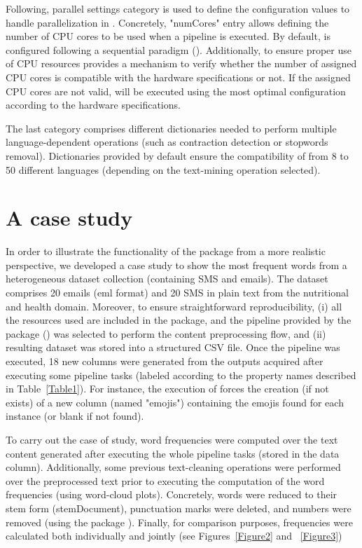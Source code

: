 Following, parallel settings category is used to define the configuration values to handle parallelization in . Concretely, "numCores" entry allows defining the number of CPU cores to be used when a pipeline is executed. By default,  is configured following a sequential paradigm (). Additionally, to ensure proper use of CPU resources  provides a mechanism to verify whether the number of assigned CPU cores is compatible with the hardware specifications or not. If the assigned CPU cores are not valid,  will be executed using the most optimal configuration according to the hardware specifications.

The last category comprises different dictionaries needed to perform multiple language-dependent operations (such as contraction detection or stopwords removal). Dictionaries provided by default ensure the compatibility of  from 8 to 50 different languages (depending on the text-mining operation selected).

\section{A case study}

In order to illustrate the functionality of the  package from a more realistic perspective, we developed a case study to show the most frequent words from a heterogeneous dataset collection (containing SMS and emails). The dataset comprises 20 emails (eml format) and 20 SMS in plain text from the nutritional and health domain. Moreover, to ensure straightforward reproducibility, (i) all the resources used are included in the package, and the pipeline provided by the package () was selected to perform the content preprocessing flow, and (ii) resulting dataset was stored into a structured CSV file. Once the pipeline was executed, 18 new columns were generated from the outputs acquired after executing some pipeline tasks (labeled according to the property names described in Table~\ref{Table1}). For instance, the execution of  forces the creation (if not exists) of a new column (named "emojis") containing the emojis found for each instance (or blank if not found). 

To carry out the case of study, word frequencies were computed over the text content generated after executing the whole pipeline tasks (stored in the data column). Additionally, some previous text-cleaning operations were performed over the preprocessed text prior to executing the computation of the word frequencies (using word-cloud plots). Concretely, words were reduced to their stem form (stemDocument), punctuation marks were deleted, and numbers were removed (using the  package \citep{D37}). Finally, for comparison purposes, frequencies were calculated both individually and jointly (see Figures~\ref{Figure2} and ~\ref{Figure3})


